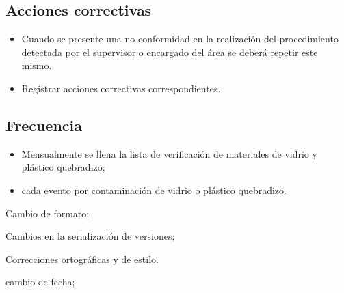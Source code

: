 \subsection{Acciones correctivas}
\begin{itemize}
	\item Cuando se presente una no conformidad en la realización del procedimiento detectada por el supervisor o encargado del área se deberá repetir este mismo.
	\item Registrar acciones correctivas correspondientes.
\end{itemize}

\subsection{Frecuencia}
\begin{itemize}
	\item Mensualmente se llena la lista de verificación de materiales de vidrio y plástico quebradizo;
	\item cada evento por contaminación de vidrio o plástico quebradizo.
\end{itemize}


\begin{changelog}[simple, sectioncmd=\subsection*,label=changelog-\thesection-\MayorVer.\MenorVer]
	\begin{version}[v=\MayorVer.\MenorVer, date=2023--01, author=Pablo E. Alanis]
		\item Cambio de formato;
		\item Cambios en la serialización de versiones;
		\item Correcciones ortográficas y de estilo.
	\end{version}

	\begin{version}[v=1.7, date=2022--05, author=Alonso M.]
		\item cambio de fecha;
	\end{version}

\end{changelog}

